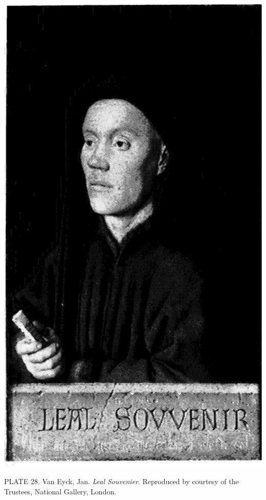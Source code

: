 \protect\hypertarget{20_ILLUSTRATIONS_FOLLOW_PAGE.xhtmlux5cux23id_2300}{}{}\includegraphics{include/html/images/345_2.png}

PLATE 28. Van Eyck, Jan. \emph{Leal Souvenier}. Reproduced by courtesy
of the Trustees, National Gallery, London.

